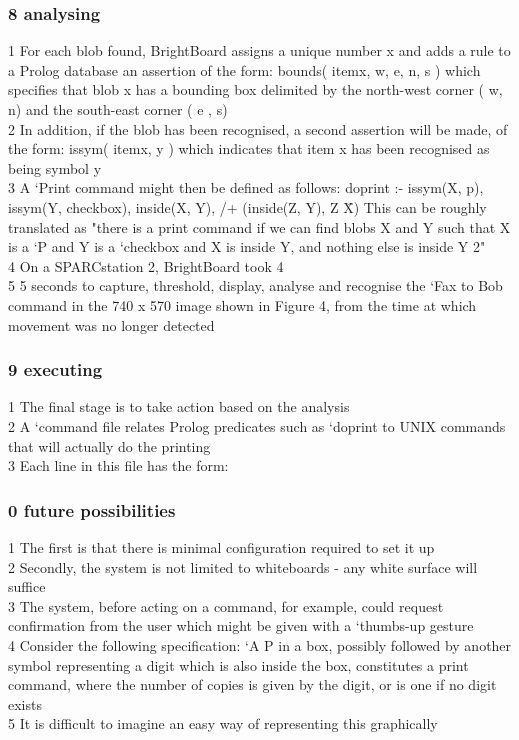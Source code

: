 \documentclass{beamer}
\begin{document}
\begin{frame}
\frametitle{8 analysing}
1  For each blob found, BrightBoard assigns a unique number x and adds a rule to a Prolog database an assertion of the form:      bounds( itemx, w, e, n, s )  which specifies that blob    x has a bounding box delimited by the north-west corner (    w,    n) and the south-east corner (    e ,    s) \\2  In addition, if the blob has been recognised, a second assertion will be made, of the form:     issym( itemx, y )  which indicates that item    x has been recognised as being symbol    y \\3  A `Print command might then be defined as follows:     doprint :- issym(X, p), issym(Y, checkbox), inside(X, Y), /+ (inside(Z, Y), Z \= X)  This can be roughly translated as "there is a print command if we can find blobs X and Y such that X is a `P and Y is a `checkbox and X is inside Y, and nothing else is inside Y    2" \\4      On a SPARCstation 2, BrightBoard took 4 \\5 5 seconds to capture, threshold, display, analyse and recognise the `Fax to Bob command in the 740 x 570 image shown in Figure 4, from the time at which movement was no longer detected \\
\end{frame}
\begin{frame}
\frametitle{9  executing}
1  The final stage is to take action based on the analysis \\2  A `command file relates Prolog predicates such as `doprint to UNIX commands that will actually do the printing \\3  Each line in this file has the form:      \\
\end{frame}
\begin{frame}
\frametitle{0 future possibilities}
1      The first is that there is minimal configuration required to set it up \\2      Secondly, the system is not limited to whiteboards - any white surface will suffice \\3  The system, before acting on a command, for example, could request confirmation from the user which might be given with a `thumbs-up gesture \\4  Consider the following specification:          `A     P in a box, possibly followed by another symbol representing a digit which is also inside the box, constitutes a print command, where the number of copies is given by the digit, or is one if no digit exists \\5     It is difficult to imagine an easy way of representing this graphically \\
\end{frame}
\end{document}
